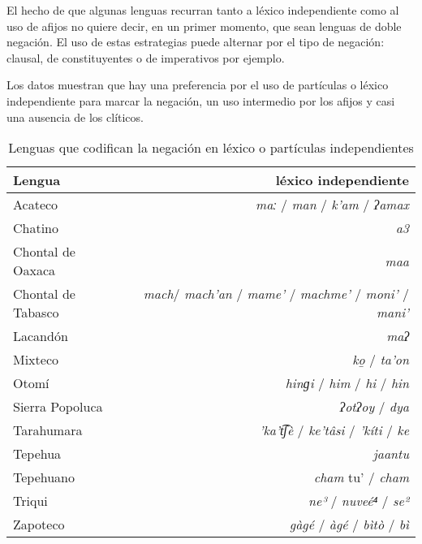 El hecho de que algunas lenguas recurran tanto a léxico independiente como al uso de afijos no quiere decir, en un primer momento, que sean lenguas de doble negación. El uso de estas estrategias puede alternar por el tipo de negación: clausal, de constituyentes o de imperativos por ejemplo.

Los datos muestran que hay una preferencia por el uso de partículas o léxico independiente para marcar la negación, un uso intermedio por los afijos y casi una ausencia de los clíticos.

\begin{table}[htbp]
\centering
\begin{tabular}{lr}
\textbf{Lengua} & \textbf{léxico independiente} \\
\hline
Acateco & {\setmainfont{Charis SIL} \textit{maː}} / {\setmainfont{Charis SIL} \textit{man}} / {\setmainfont{Charis SIL} \textit{k’am}} / {\setmainfont{Charis SIL} \textit{ʔamax}} \\
Chatino & {\setmainfont{Charis SIL} \textit{a3}} \\
Chontal de Oaxaca & {\setmainfont{Charis SIL} \textit{maa}} \\
Chontal de Tabasco & {\setmainfont{Charis SIL} \textit{mach}}/ {\setmainfont{Charis SIL} \textit{mach’an}} / {\setmainfont{Charis SIL} \textit{mame’}} / {\setmainfont{Charis SIL} \textit{machme’}} / {\setmainfont{Charis SIL} \textit{moni’}} / {\setmainfont{Charis SIL} \textit{mani’}} \\
Lacandón & {\setmainfont{Charis SIL} \textit{maʔ}} \\
Mixteco & {\setmainfont{Charis SIL} \textit{ko̱}} / {\setmainfont{Charis SIL} \textit{ta’on}} \\
Otomí & {\setmainfont{Charis SIL} \textit{hinɡi}} / {\setmainfont{Charis SIL} \textit{him}} / {\setmainfont{Charis SIL} \textit{hi}} / {\setmainfont{Charis SIL} \textit{hin}} \\
Sierra Popoluca & {\setmainfont{Charis SIL} \textit{ʔotʔoy}} / {\setmainfont{Charis SIL} \textit{dya}} \\
Tarahumara & {\setmainfont{Charis SIL} \textit{’ka’t͡ʃè}} / {\setmainfont{Charis SIL} \textit{ke’tâsi}} / {\setmainfont{Charis SIL} \textit{’kíti}} / {\setmainfont{Charis SIL} \textit{ke}} \\
Tepehua & {\setmainfont{Charis SIL} \textit{jaantu}} \\
Tepehuano & {\setmainfont{Charis SIL} \textit{cham}} tu’ / {\setmainfont{Charis SIL} \textit{cham}} \\
Triqui & {\setmainfont{Charis SIL} \textit{ne³}} / {\setmainfont{Charis SIL} \textit{nuveé⁴}} / {\setmainfont{Charis SIL} \textit{se²}} \\
Zapoteco & {\setmainfont{Charis SIL} \textit{gàgé}} / {\setmainfont{Charis SIL} \textit{àgé}} / {\setmainfont{Charis SIL} \textit{bìtò}} / {\setmainfont{Charis SIL} \textit{bì}} \\
\hline
\end{tabular}
\caption{Lenguas que codifican la negación en léxico o partículas independientes}
\label{cuadro2}
\end{table}
  
